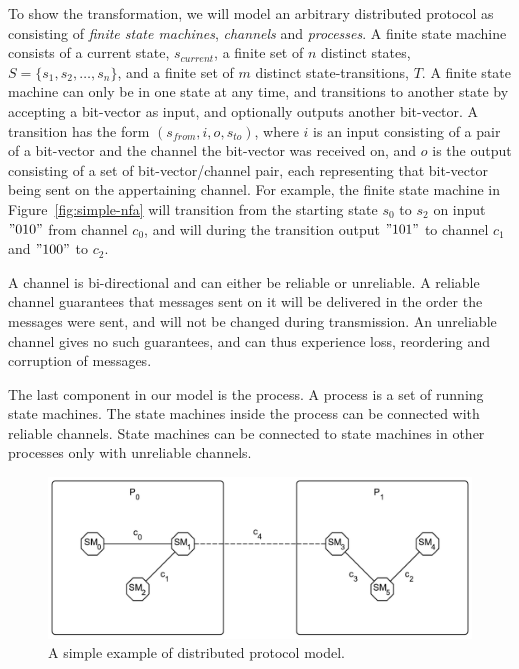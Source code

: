 \documentclass{article}
\begin{document}
	To show the transformation, we will model an arbitrary distributed protocol as consisting of \textit{finite state machines}, \textit{channels} and \textit{processes}.
	A finite state machine consists of a current state, $s_{current}$, a finite set of $n$ distinct states, $S=\{s_1, s_2, \dots, s_n\}$, and a finite set of $m$ distinct state-transitions, $T$.
	A finite state machine can only be in one state at any time, and transitions to another state by accepting a bit-vector as input, and optionally outputs another bit-vector.
	A transition has the form $(s_{from}, i, o, s_{to})$, where $i$ is an input consisting of a pair of a bit-vector and the channel the bit-vector was received on, and $o$ is the output consisting of a set of bit-vector/channel pair, each representing that bit-vector being sent on the appertaining channel.
	For example, the finite state machine in Figure~\ref{fig:simple-nfa} will transition from the starting state $s_0$ to $s_2$ on input $"010"$ from channel $c_0$, and will during the transition output $"101"$ to channel $c_1$ and $"100"$ to $c_2$.

	A channel is bi-directional and can either be reliable or unreliable.
	A reliable channel guarantees that messages sent on it will be delivered in the order the messages were sent, and will not be changed during transmission.
	An unreliable channel gives no such guarantees, and can thus experience loss, reordering and corruption of messages.

	The last component in our model is the process.
	A process is a set of running state machines.
	The state machines inside the process can be connected with reliable channels.
	State machines can be connected to state machines in other processes only with unreliable channels.

	\begin{figure}[ht]
		\center
		\includegraphics[scale=0.6]{figures/state-machines/Distributed-protocol-model.pdf}
		\caption{A simple example of distributed protocol model.\label{fig:simple-model}}
	\end{figure}
\end{document}
